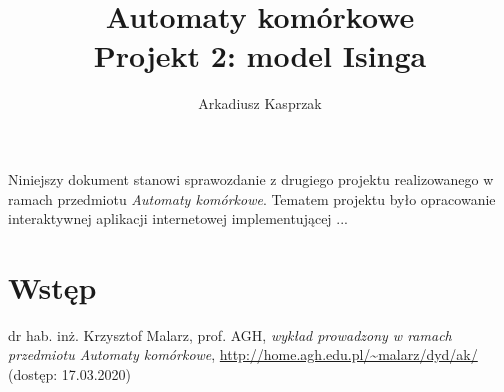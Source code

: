 \documentclass[12pt] {article}
\title {
	\large Automaty komórkowe \\
    \normalsize Projekt 2: model Isinga
    }
\author {Arkadiusz Kasprzak}
\date{}
\renewenvironment{abstract}
 {\small
  \begin{center}
  \bfseries \abstractname\vspace{-.5em}\vspace{0pt}
  \end{center}
  \list{}{%
    \setlength{\leftmargin}{5mm}%
    \setlength{\rightmargin}{\leftmargin}%
  }%
  \item\relax}
 {\endlist}
\begin{document}
\maketitle

\begin{abstract}
Niniejszy dokument stanowi sprawozdanie z drugiego projektu realizowanego w ramach przedmiotu \textit{Automaty komórkowe}. Tematem projektu było opracowanie interaktywnej aplikacji internetowej implementującej ... 

\end{abstract}

\tableofcontents

\newpage 

\section{Wstęp}



\newpage

\begin{thebibliography}{9}

  dr hab. inż. Krzysztof Malarz, prof. AGH,
  \emph{wykład prowadzony w ramach przedmiotu Automaty komórkowe},
  \url{http://home.agh.edu.pl/~malarz/dyd/ak/} (dostęp: 17.03.2020)

\end{thebibliography}
\end{document}
